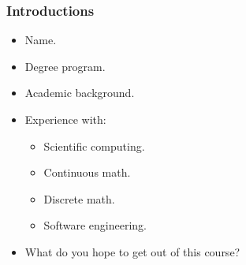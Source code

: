 \documentclass[13pt]{beamer} %
\begin{document}

\begin{frame}
\frametitle{Introductions}

\begin{itemize}
\item Name.
\item Degree program.
\item Academic background.
\item Experience with:
\begin{itemize}
\item Scientific computing.
\item Continuous math.
\item Discrete math.
\item Software engineering.
\end{itemize}
\item What do you hope to get out of this course?
\end{itemize}

\end{frame}

\end{document}
